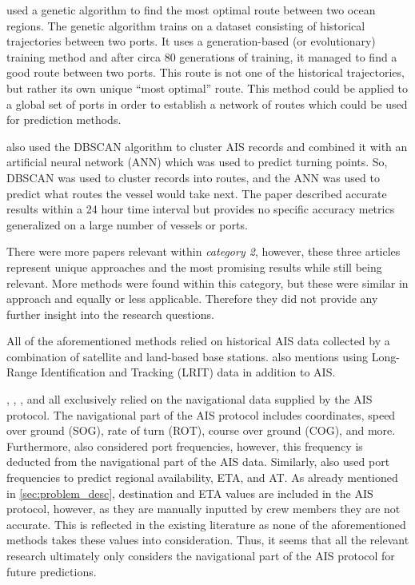 \cite{Pelizzari2016GeneticAF} used a genetic algorithm to find the most optimal route between two ocean regions. The genetic algorithm trains on a dataset consisting of historical trajectories between two ports. It uses a generation-based (or evolutionary) training method and after circa 80 generations of training, it managed to find a good route between two ports. This route is not one of the historical trajectories, but rather its own unique “most optimal” route. This method could be applied to a global set of ports in order to establish a network of routes which could be used for prediction methods.


\cite{Daranda2016NeuralNA} also used the DBSCAN algorithm to cluster AIS records and combined it with an artificial neural network (ANN) which was used to predict turning points. So, DBSCAN was used to cluster records into routes, and the ANN was used to predict what routes the vessel would take next. The paper described accurate results within a 24 hour time interval but provides no specific accuracy metrics generalized on a large number of vessels or ports.

There were more papers relevant within \textit{category 2}, however, these three articles represent unique approaches and the most promising results while still being relevant. More methods were found within this category, but these were similar in approach and equally or less applicable. Therefore they did not provide any further insight into the research questions.



All of the aforementioned methods relied on historical AIS data collected by a combination of satellite and land-based base stations. \cite{Pelizzari2016GeneticAF} also mentions using Long-Range Identification and Tracking (LRIT) data in addition to AIS.


\cite{Daranda2016NeuralNA}, \cite{Pelizzari2016GeneticAF}, \cite{pallotta}, and \cite{ZHANG2020102729} all exclusively relied on the navigational data supplied by the AIS protocol. The navigational part of the AIS protocol includes coordinates, speed over ground (SOG), rate of turn (ROT), course over ground (COG), and more. Furthermore, \cite{ZHANG2020102729} also considered port frequencies, however, this frequency is deducted from the navigational part of the AIS data. Similarly, \cite{lechtenberg2019} also used port frequencies to predict regional availability, ETA, and AT. As already mentioned in \cref{sec:problem_desc}, destination and ETA values are included in the AIS protocol, however, as they are manually inputted by crew members they are not accurate. This is reflected in the existing literature as none of the aforementioned methods takes these values into consideration. Thus, it seems that all the relevant research ultimately only considers the navigational part of the AIS protocol for future predictions.

